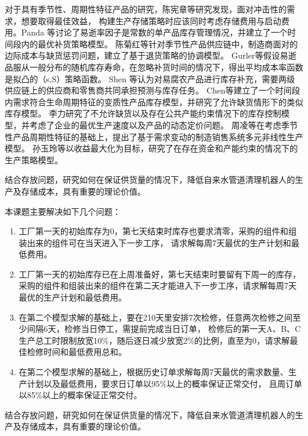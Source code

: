 对于具有季节性、周期性特征产品的研究，陈宪章等\cite{陈宪章2004冲击型负荷下的生产存储模型研究}研究发现，面对冲击性的需求，想要取得最佳效益，
构建生产存储策略时应该同时考虑存储费用与启动费用。Panda 等\cite{panda2008optimal}讨论了易逝率因子是常数的单产品库存管理情况，并建立了一个时间段内的最优补货策略模型。
陈菊红等\cite{陈菊红2010受资源限制且带有缺货惩罚的季节性产品供应链协调}针对季节性产品供应链中，制造商面对的边际成本与缺货惩罚问题，建立了基于退货策略的协调模型。
Gurler等\cite{gurler2008analysis}假设易逝品服从一般分布的随机库存寿命，在忽略补货时间的情况下，得出平均成本率函数是拟凸的（s,S）策略函数。
Shen 等\cite{shen2011modelling}认为对易腐农产品进行库存补充，需要两级供应链上的供应商和零售商共同承担预测与库存任务。
Chen等\cite{chen2007net}建立了一个时间段内需求符合生命周期特征的变质性产品库存模型，并研究了允许缺货情形下的类似库存模型。
李力\cite{李力2015多种易逝品的库存控制模型及动态定价}研究了不允许缺货以及存在公共产能约束情况下的库存控制模型，并考虑了企业的最优生产速度以及产品的动态定价问题。
周凌等\cite{周凌2014基于柔性产能的季节性产品生产决策模型}在考虑季节性产品周期性特征的基础上，提出了基于需求变动的制造销售系统多元非线性生产模型。
孙玉玲等\cite{孙玉玲2009考虑能力约束的易逝品生产策略}以收益最大化为目标，研究了在存在资金和产能约束的情况下的生产策略模型。

结合存放问题，研究如何在保证供货量的情况下，降低自来水管道清理机器人的生产及存储成本，具有重要的理论价值。

本课题主要解决如下几个问题：
\begin{enumerate}
  \item 工厂第一天的初始库存为0，第七天结束时库存也要求清零，采购的组件和组装出来的组件可在当天进入下一步工序，
  请求解每周7天最优的生产计划和最低费用。
  \item 工厂第一天的初始库存已在上周准备好，第七天结束时要留有下周一的库存，
  采购的组件和组装出来的组件在第二天才能进入下一步工序，请求解每周7天最优的生产计划和最低费用。
  \item 在第二个模型求解的基础上，要在210天里安排7次检修，任意两次检修之间至少间隔6天，检修当日停工，需提前完成当日订单，
  检修后的第一天A、B、C生产总工时限制放宽10\%，随后逐日减少放宽2\%的比例，直至为0，请求解最佳检修时间和最低费用总和。
  \item 在第二个模型求解的基础上，根据历史订单求解每周7天最优的需求数量、生产计划以及最低费用，要求日订单以95\%以上的概率保证正常交付，
  且周订单以85\%以上的概率保证正常交付。
\end{enumerate}

结合存放问题，研究如何在保证供货量的情况下，降低自来水管道清理机器人的生产及存储成本，具有重要的理论价值。
